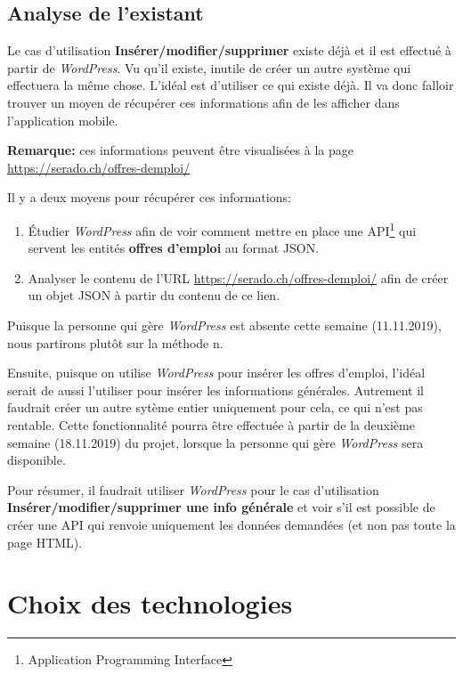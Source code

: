 \documentclass[french]{report}
\begin{document}
\subsection{Analyse de l'existant}

Le cas d'utilisation \textbf{Insérer/modifier/supprimer} existe déjà et il est
effectué à partir de \textit{WordPress}. Vu qu'il existe, inutile de créer un autre
système qui effectuera la même chose. L'idéal est d'utiliser ce qui existe déjà. Il
va donc falloir trouver un moyen de récupérer ces informations afin de les afficher
dans l'application mobile.

\textbf{Remarque:} ces informations peuvent être visualisées à la page 
\url{https://serado.ch/offres-demploi/}

Il y a deux moyens pour récupérer ces informations:
\begin{enumerate}
    \item Étudier \textit{WordPress} afin de voir comment mettre en place une
    API\footnote{Application Programming Interface} qui servent les entités
    \textbf{offres d'emploi} au format JSON.
    \item Analyser le contenu de l'URL \url{https://serado.ch/offres-demploi/} afin
    de créer un objet JSON à partir du contenu de ce lien.
\end{enumerate}
\vspace{1em}

Puisque la personne qui gère \textit{WordPress} est absente cette semaine
(11.11.2019), nous partirons plutôt sur la méthode n.

Ensuite, puisque on utilise \textit{WordPress} pour insérer les offres d'emploi,
l'idéal serait de aussi l'utiliser pour insérer les informations générales.
Autrement il faudrait créer un autre sytème entier uniquement pour cela, ce qui n'est
pas rentable. Cette fonctionnalité pourra être effectuée à partir de la deuxième semaine
(18.11.2019) du projet, lorsque la personne qui gère \textit{WordPress} sera disponible.

Pour résumer, il faudrait utiliser \textit{WordPress} pour le cas d'utilisation
\textbf{Insérer/modifier/supprimer une info générale} et voir s'il est possible de
créer une API qui renvoie uniquement les données demandées (et non pas toute la
page HTML).


\section{Choix des technologies}
\end{document}
